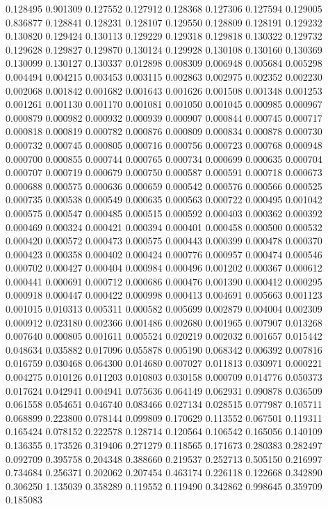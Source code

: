 0.128495
0.901309
0.127552
0.127912
0.128368
0.127306
0.127594
0.129005
0.836877
0.128841
0.128231
0.128107
0.129550
0.128809
0.128191
0.129232
0.130820
0.129424
0.130113
0.129229
0.129318
0.129818
0.130322
0.129732
0.129628
0.129827
0.129870
0.130124
0.129928
0.130108
0.130160
0.130369
0.130099
0.130127
0.130337
0.012898
0.008309
0.006948
0.005684
0.005298
0.004494
0.004215
0.003453
0.003115
0.002863
0.002975
0.002352
0.002230
0.002068
0.001842
0.001682
0.001643
0.001626
0.001508
0.001348
0.001253
0.001261
0.001130
0.001170
0.001081
0.001050
0.001045
0.000985
0.000967
0.000879
0.000982
0.000932
0.000939
0.000907
0.000844
0.000745
0.000717
0.000818
0.000819
0.000782
0.000876
0.000809
0.000834
0.000878
0.000730
0.000732
0.000745
0.000805
0.000716
0.000756
0.000723
0.000768
0.000948
0.000700
0.000855
0.000744
0.000765
0.000734
0.000699
0.000635
0.000704
0.000707
0.000719
0.000679
0.000750
0.000587
0.000591
0.000718
0.000673
0.000688
0.000575
0.000636
0.000659
0.000542
0.000576
0.000566
0.000525
0.000735
0.000538
0.000549
0.000635
0.000563
0.000722
0.000495
0.001042
0.000575
0.000547
0.000485
0.000515
0.000592
0.000403
0.000362
0.000392
0.000469
0.000324
0.000421
0.000394
0.000401
0.000458
0.000500
0.000532
0.000420
0.000572
0.000473
0.000575
0.000443
0.000399
0.000478
0.000370
0.000423
0.000358
0.000402
0.000424
0.000776
0.000957
0.000474
0.000546
0.000702
0.000427
0.000404
0.000984
0.000496
0.001202
0.000367
0.000612
0.000441
0.000691
0.000712
0.000686
0.000476
0.001390
0.000412
0.000295
0.000918
0.000447
0.000422
0.000998
0.000413
0.004691
0.005663
0.001123
0.001015
0.010313
0.005311
0.000582
0.005699
0.002879
0.004004
0.002309
0.000912
0.023180
0.002366
0.001486
0.002680
0.001965
0.007907
0.013268
0.007640
0.000805
0.001611
0.005524
0.020219
0.002032
0.001657
0.015442
0.048634
0.035882
0.017096
0.055878
0.005190
0.068342
0.006392
0.007816
0.016759
0.030468
0.064300
0.014680
0.007027
0.011813
0.030971
0.000221
0.004275
0.010126
0.011203
0.010803
0.030158
0.000709
0.014776
0.050373
0.017624
0.042941
0.004941
0.075636
0.064149
0.062931
0.090878
0.036509
0.061558
0.054651
0.046740
0.083466
0.027134
0.028515
0.077987
0.105711
0.068899
0.223800
0.078144
0.099809
0.170629
0.113552
0.067501
0.119311
0.165424
0.078152
0.222578
0.128714
0.120564
0.106542
0.165056
0.140109
0.136355
0.173526
0.319406
0.271279
0.118565
0.171673
0.280383
0.282497
0.092709
0.395758
0.204348
0.388660
0.219537
0.252713
0.505150
0.216997
0.734684
0.256371
0.202062
0.207454
0.463174
0.226118
0.122668
0.342890
0.306250
1.135039
0.358289
0.119552
0.119490
0.342862
0.998645
0.359709
0.185083
